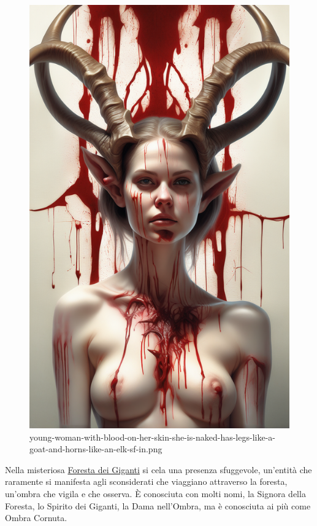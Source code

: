 \begin{figure}
\centering
\includegraphics{young-woman-with-blood-on-her-skin-she-is-naked-has-legs-like-a-goat-and-horns-like-an-elk-sf-in.png}
\caption{young-woman-with-blood-on-her-skin-she-is-naked-has-legs-like-a-goat-and-horns-like-an-elk-sf-in.png}
\end{figure}

Nella misteriosa
\href{Foresta\%20dei\%20Giganti\%2003a15f8accd74ec0a08db3f3c9a26b2b.md}{Foresta
dei Giganti} si cela una presenza sfuggevole, un'entità che raramente si
manifesta agli sconsiderati che viaggiano attraverso la foresta,
un'ombra che vigila e che osserva. È conosciuta con molti nomi, la
Signora della Foresta, lo Spirito dei Giganti, la Dama nell'Ombra, ma è
conosciuta ai più come Ombra Cornuta.

